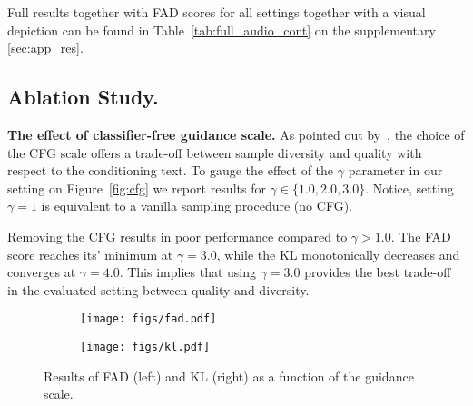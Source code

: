 Full results together with FAD scores for all settings together with a visual depiction can be found in Table~\ref{tab:full_audio_cont} on the supplementary \ref{sec:app_res}.



\subsection{Ablation Study.}
\label{sec:abl}

{\noindent \bf{The effect of classifier-free guidance scale.}} As pointed out by~\citet{ho2021classifier}, the choice of the \ac{CFG} scale offers a trade-off between sample diversity and quality with respect to the conditioning text. To gauge the effect of the $\gamma$ parameter in our setting on Figure~\ref{fig:cfg} we report results for $\gamma \in \{1.0, 2.0, 3.0\}$. Notice, setting $\gamma=1$ is equivalent to a vanilla sampling procedure (no \ac{CFG}).


Removing the \ac{CFG} results in poor performance compared to $\gamma > 1.0$. The FAD score reaches its' minimum at $\gamma = 3.0$, while the KL monotonically decreases and converges at $\gamma=4.0$. This implies that using $\gamma = 3.0$ provides the best trade-off in the evaluated setting between quality and diversity.



\begin{figure}
\centering
\begin{subfigure}{0.45\textwidth}
    \centering
    \texttt{[image: figs/fad.pdf]}
    \label{fig:first}
\end{subfigure}
\begin{subfigure}{0.46\textwidth}
    \centering
    \texttt{[image: figs/kl.pdf]}
    \label{fig:second}
\end{subfigure}
\caption{\label{fig:cfg} Results of FAD (left) and KL (right) as a function of the guidance scale.}
\label{fig:figures}
\end{figure}

